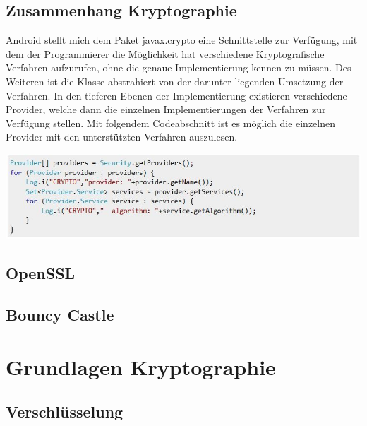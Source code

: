 \documentclass[10pt, a4paper]{scrreprt}
\begin{document}
\section{Zusammenhang Kryptographie}
Android stellt mich dem Paket javax.crypto eine Schnittstelle zur Verfügung, mit dem der Programmierer die Möglichkeit hat verschiedene Kryptografische Verfahren aufzurufen, ohne die genaue Implementierung kennen zu müssen. Des Weiteren ist die Klasse abstrahiert von der darunter liegenden Umsetzung der Verfahren. %
In den tieferen Ebenen der Implementierung existieren verschiedene Provider, welche dann die einzelnen Implementierungen der Verfahren zur Verfügung stellen. Mit folgendem Codeabschnitt ist es möglich die einzelnen Provider mit den unterstützten Verfahren auszulesen. \\
\begin{center}
\includegraphics[scale=1.0]{read_cryptoprovider.JPG} %
\end{center}


\section{OpenSSL}
\section{Bouncy Castle}

\chapter{Grundlagen Kryptographie}
\section{Verschlüsselung}
\end{document}
